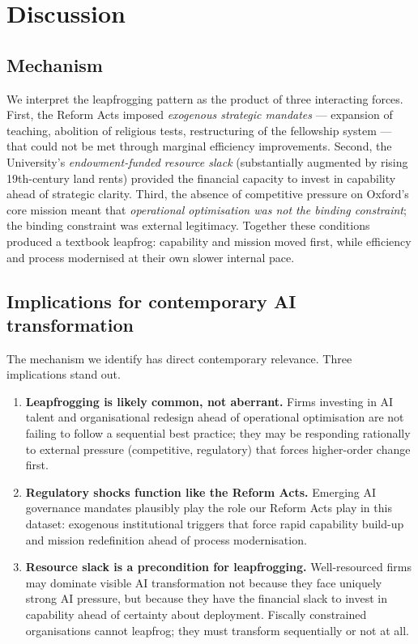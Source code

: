 \documentclass[11pt]{article}
\begin{document}
\section{Discussion}
\label{sec:discussion}

\subsection{Mechanism}

We interpret the leapfrogging pattern as the product of three interacting forces. First, the Reform Acts imposed \emph{exogenous strategic mandates} --- expansion of teaching, abolition of religious tests, restructuring of the fellowship system --- that could not be met through marginal efficiency improvements. Second, the University's \emph{endowment-funded resource slack} (substantially augmented by rising 19th-century land rents) provided the financial capacity to invest in capability ahead of strategic clarity. Third, the absence of competitive pressure on Oxford's core mission meant that \emph{operational optimisation was not the binding constraint}; the binding constraint was external legitimacy. Together these conditions produced a textbook leapfrog: capability and mission moved first, while efficiency and process modernised at their own slower internal pace.

\subsection{Implications for contemporary AI transformation}

The mechanism we identify has direct contemporary relevance. Three implications stand out.
\begin{enumerate}
\item \textbf{Leapfrogging is likely common, not aberrant.} Firms investing in AI talent and organisational redesign ahead of operational optimisation are not failing to follow a sequential best practice; they may be responding rationally to external pressure (competitive, regulatory) that forces higher-order change first.
\item \textbf{Regulatory shocks function like the Reform Acts.} Emerging AI governance mandates plausibly play the role our Reform Acts play in this dataset: exogenous institutional triggers that force rapid capability build-up and mission redefinition ahead of process modernisation.
\item \textbf{Resource slack is a precondition for leapfrogging.} Well-resourced firms may dominate visible AI transformation not because they face uniquely strong AI pressure, but because they have the financial slack to invest in capability ahead of certainty about deployment. Fiscally constrained organisations cannot leapfrog; they must transform sequentially or not at all.
\end{enumerate}
\end{document}
